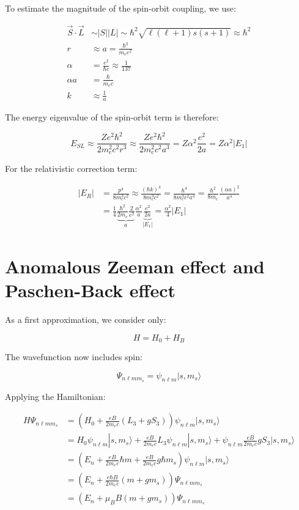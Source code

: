To estimate the magnitude of the spin-orbit coupling, we use:

\begin{align}
\vec{S}\cdot\vec{L} &\sim |S||L| \sim \hbar^2\sqrt{\ell(\ell+1)s(s+1)} \approx \hbar^2 \\
r &\approx a=\frac{\hbar^2}{m_e e^2} \\
\alpha &= \frac{e^2}{\hbar c} \approx \frac{1}{137} \\
\alpha a &= \frac{\hbar}{m_e c} \\
k &\approx \frac{1}{a}
\end{align}

The energy eigenvalue of the spin-orbit term is therefore:

\begin{equation}
E_{SL} \approx \frac{Ze^2\hbar^2}{2m_e^2c^2r^3} \approx \frac{Ze^2\hbar^2}{2m_e^2c^2a^3}=Z\alpha^2\frac{e^2}{2a}=Z\alpha^2|E_1|
\end{equation}

For the relativistic correction term:

\begin{align}
|E_R| &= \frac{p^4}{8m_e^3c^2} \approx \frac{(\hbar k)^4}{8m_e^3c^2}=\frac{\hbar^4}{8m_e^3c^2a^4}=\frac{\hbar^2}{8m_e}\frac{(\alpha a)^2}{a^4}\\
&= \frac{1}{4}\underbrace{\frac{\hbar^2}{2m_e}\frac{2}{e^2}}_a\frac{\alpha^2}{a}\underbrace{\frac{e^2}{2a}}_{|E_1|}=\frac{\alpha^2}{4}|E_1|
\end{align}

\section{Anomalous Zeeman effect and Paschen-Back effect}
As a first approximation, we consider only:

\begin{equation}
H=H_0+H_B
\end{equation}

The wavefunction now includes spin:

\begin{equation}
\Psi_{n\ell mm_s}=\psi_{n\ell m}|s,m_s\rangle
\end{equation}

Applying the Hamiltonian:

\begin{align}
H\Psi_{n\ell mm_s} &= (H_0+\frac{eB}{2m_e c}(L_3+gS_3))\psi_{n\ell m}|s,m_s\rangle\\
&= H_0\psi_{n\ell m}|s,m_s\rangle+\frac{eB}{2m_e c}L_3\psi_{n\ell m}|s,m_s\rangle+\psi_{n\ell m}\frac{eB}{2m_e c}gS_3|s,m_s\rangle\\
&= (E_n+\frac{eB}{2m_e c}\hbar m+\frac{eB}{2m_e c}g\hbar m_s)\psi_{n\ell m}|s,m_s\rangle\\
&= (E_n+\frac{e\hbar B}{2m_e c}(m+gm_s))\Psi_{n\ell mm_s}\\
&= (E_n+\mu_B B(m+gm_s))\Psi_{n\ell mm_s}
\end{align}

